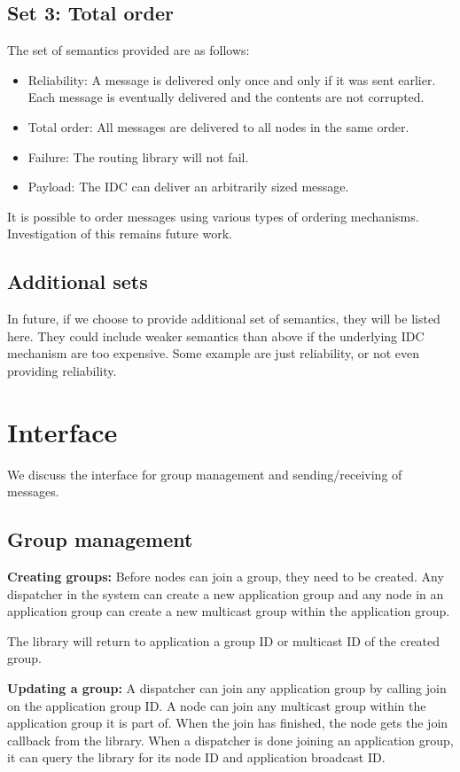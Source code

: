 \documentclass[a4paper,twoside]{report} %
\begin{document}
\subsection{Set 3: Total order}
The set of semantics provided are as follows:

\begin{itemize}
\item Reliability:
  A message is delivered only once and only if it was sent earlier.
  Each message is eventually delivered and the contents are not corrupted.
\item Total order:
  All messages are delivered to all nodes in the same order.
\item Failure:
  The routing library will not fail.
\item Payload:
  The IDC can deliver an arbitrarily sized message.
\end{itemize}

It is possible to order messages using various types of ordering mechanisms.
Investigation of this remains future work.

\subsection{Additional sets}
In future, if we choose to provide additional set of semantics,
they will be listed here.
They could include weaker semantics than above if the underlying IDC mechanism
are too expensive.
Some example are just reliability, or not even providing reliability.

\section{Interface}
We discuss the interface for group management and sending/receiving of messages.

\subsection{Group management}

\textbf{Creating groups:}
Before nodes can join a group, they need to be created.
Any dispatcher in the system can create a new application group
and any node in an application group can create a new multicast group
within the application group.

The library will return to application a group ID or
multicast ID of the created group.

\textbf{Updating a group:}
A dispatcher can join any application group by calling join on
the application group ID.
A node can join any multicast group within the application group it is part of.
When the join has finished, the node gets the join callback from the library.
When a dispatcher is done joining an application group,
it can query the library for its node ID and application broadcast ID.
\end{document}
